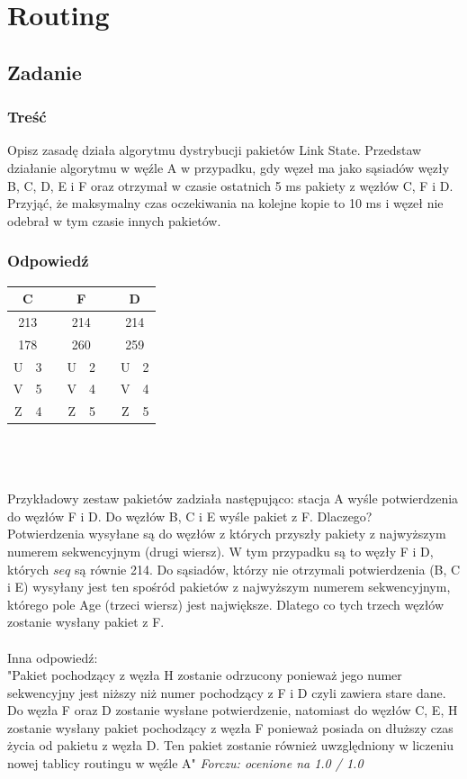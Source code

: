 \section{Routing}
	\subsection{Zadanie}
		\subsubsection{Treść}
			Opisz zasadę działa algorytmu dystrybucji pakietów Link State. Przedstaw działanie algorytmu w węźle A w przypadku, gdy węzeł ma jako sąsiadów węzły B, C, D, E i F oraz otrzymał w czasie ostatnich 5 ms pakiety z węzłów C, F i D. Przyjąć, że maksymalny czas oczekiwania na kolejne kopie to 10 ms i węzeł nie odebrał w tym czasie innych pakietów.
		\subsubsection{Odpowiedź}
				\begin{tabular}{|c|c|c|c|c|c|c|c|}
					\hline \multicolumn{2}{|c|}{\textbf{C}}  & & \multicolumn{2}{|c|}{\textbf{F}} & & \multicolumn{2}{|c|}{\textbf{D}}\\ 
					\hline \multicolumn{2}{|c|}{213} & &\multicolumn{2}{|c|}{214} & &\multicolumn{2}{|c|}{214} \\ 
					\hline \multicolumn{2}{|c|}{178} & &\multicolumn{2}{|c|}{260} & &\multicolumn{2}{|c|}{259}   \\ 
					\hline U & 3 & & U & 2 & & U & 2\\ 
					\hline V & 5 & & V & 4 & & V & 4\\
					\hline Z & 4 & & Z & 5 & & Z & 5\\
					\hline 
				\end{tabular}\\\\\\
			Przykładowy zestaw pakietów zadziała następująco: stacja A wyśle potwierdzenia do węzłów F i D. Do węzłów B, C i E wyśle pakiet z F. Dlaczego?\\
			Potwierdzenia wysyłane są do węzłów z których przyszły pakiety z najwyższym numerem sekwencyjnym (drugi wiersz). W tym przypadku są to węzły F i D, których $ seq $ są równie 214. Do sąsiadów, którzy nie otrzymali potwierdzenia (B, C i E) wysyłany jest ten spośród pakietów z najwyższym numerem sekwencyjnym, którego pole Age (trzeci wiersz) jest największe. Dlatego co tych trzech węzłów zostanie wysłany pakiet z F.\\\\
			Inna odpowiedź:\\
			"Pakiet pochodzący z węzła H zostanie odrzucony ponieważ jego numer sekwencyjny jest niższy niż numer pochodzący z F i D czyli zawiera stare dane. Do węzła F oraz D zostanie wysłane potwierdzenie, natomiast do węzłów C, E, H zostanie wysłany pakiet pochodzący z węzła F ponieważ posiada on dłuższy czas życia od pakietu z węzła D. Ten pakiet zostanie również uwzględniony w liczeniu nowej tablicy routingu w węźle A"
			{\small \emph{Forczu: ocenione na 1.0 / 1.0}}
\newpage

